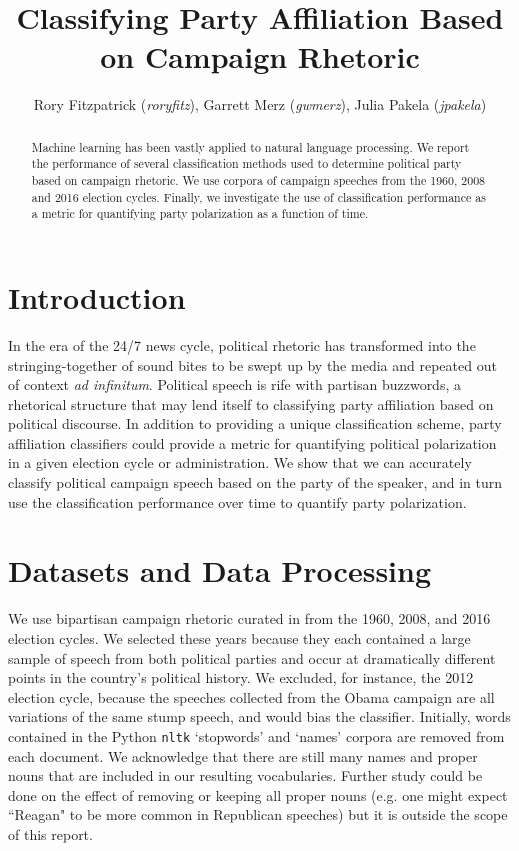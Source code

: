 \documentclass[aps, prl, reprint, showpacs]{revtex4-1}
\begin{document}
\title{Classifying Party Affiliation Based on Campaign Rhetoric}

\author{Rory Fitzpatrick (\textit{roryfitz}), Garrett Merz (\textit{gwmerz}), Julia Pakela (\textit{jpakela})}

\begin{abstract}
\noindent Machine learning has been vastly applied to natural language processing. We report the performance of several classification methods used to determine political party based on campaign rhetoric. We use corpora of campaign speeches from the 1960, 2008 and 2016 election cycles. Finally, we investigate the use of classification performance as a metric for quantifying party polarization as a function of time.
\end{abstract}


\maketitle

\section{Introduction}
In the era of the 24/7 news cycle, political rhetoric has transformed into the stringing-together of sound bites to be swept up by the media and repeated out of context \textit{ad infinitum}. Political speech is rife with partisan buzzwords, a rhetorical structure that may lend itself to classifying party affiliation based on political discourse. In addition to providing a unique classification scheme, party affiliation classifiers could provide a metric for quantifying political polarization in a given election cycle or administration. We show that we can accurately classify political campaign speech based on the party of the speaker, and in turn use the classification performance over time to quantify party polarization. 

\section{Datasets and Data Processing}
We use bipartisan campaign rhetoric curated in \cite{peters} from the 1960, 2008, and 2016 election cycles. We selected these years because they each contained a large sample of speech from both political parties and occur at dramatically different points in the country's political history. We excluded, for instance, the 2012 election cycle, because the speeches collected from the Obama campaign are all variations of the same stump speech, and would bias the classifier. Initially, words contained in the  Python \texttt{nltk} `stopwords' and `names' corpora are removed from each document. We acknowledge that there are still many names and proper nouns that are included in our resulting vocabularies. Further study could be done on the effect of removing or keeping all proper nouns (e.g. one might expect ``Reagan" to be more common in Republican speeches) but it is outside the scope of this report.
\end{document}
